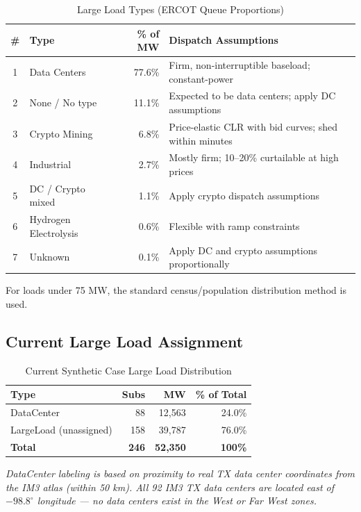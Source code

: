 \documentclass[11pt]{article}
\begin{document}
\begin{table}[H]
\centering
\caption{Large Load Types (ERCOT Queue Proportions)}
\small
\begin{tabular}{clrl}
\toprule
\textbf{\#} & \textbf{Type} & \textbf{\% of MW} & \textbf{Dispatch Assumptions} \\
\midrule
1 & Data Centers          & 77.6\% & Firm, non-interruptible baseload; constant-power \\
2 & None / No type        & 11.1\% & Expected to be data centers; apply DC assumptions \\
3 & Crypto Mining         & 6.8\%  & Price-elastic CLR with bid curves; shed within minutes \\
4 & Industrial            & 2.7\%  & Mostly firm; 10--20\% curtailable at high prices \\
5 & DC / Crypto mixed     & 1.1\%  & Apply crypto dispatch assumptions \\
6 & Hydrogen Electrolysis & 0.6\%  & Flexible with ramp constraints \\
7 & Unknown               & 0.1\%  & Apply DC and crypto assumptions proportionally \\
\bottomrule
\end{tabular}
\end{table}

\noindent For loads under 75 MW, the standard census/population distribution method is used.

\subsection*{Current Large Load Assignment}

\begin{table}[H]
\centering
\caption{Current Synthetic Case Large Load Distribution}
\begin{tabular}{lrrr}
\toprule
\textbf{Type} & \textbf{Subs} & \textbf{MW} & \textbf{\% of Total} \\
\midrule
DataCenter              & 88  & 12,563 & 24.0\% \\
LargeLoad (unassigned)  & 158 & 39,787 & 76.0\% \\
\midrule
\textbf{Total}          & \textbf{246} & \textbf{52,350} & \textbf{100\%} \\
\bottomrule
\end{tabular}
\end{table}

\noindent\textit{DataCenter labeling is based on proximity to real TX data center coordinates from the IM3 atlas (within 50 km). All 92 IM3 TX data centers are located east of $-98.8^{\circ}$ longitude --- no data centers exist in the West or Far West zones.}
\end{document}
